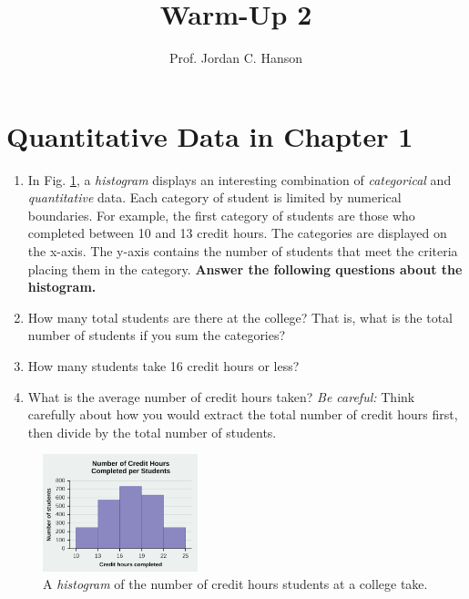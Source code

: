 \documentclass{article}
\begin{document}
\title{Warm-Up 2}
\author{Prof. Jordan C. Hanson}

\maketitle

\section{Quantitative Data in Chapter 1}

\begin{enumerate}
\item In Fig. \ref{fig:hist}, a \textit{histogram} displays an interesting combination of \textit{categorical} and \textit{quantitative} data.  Each category of student is limited by numerical boundaries.  For example, the first category of students are those who completed between 10 and 13 credit hours.  The categories are displayed on the x-axis.  The y-axis contains the number of students that meet the criteria placing them in the category.  \textbf{Answer the following questions about the histogram.}
\item How many total students are there at the college?  That is, what is the total number of students if you sum the categories? \\ \vspace{1cm}
\item How many students take 16 credit hours or less? \\ \vspace{1cm}
\item What is the average number of credit hours taken?  \textit{Be careful:} Think carefully about how you would extract the total number of credit hours first, then divide by the total number of students.
\end{enumerate}

\begin{figure}
\centering
\includegraphics[width=0.4\textwidth]{../figures/histogram.png}
\caption{\label{fig:hist} A \textit{histogram} of the number of credit hours students at a college take.}
\end{figure}
\end{document}
